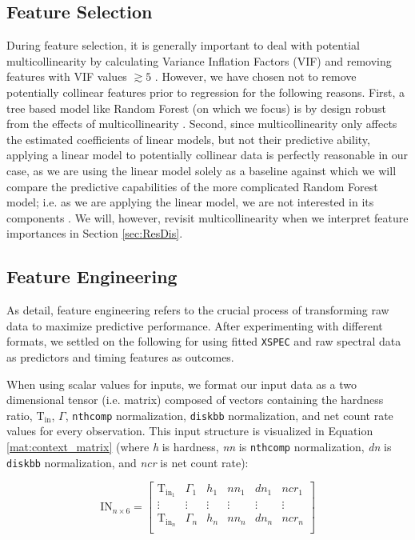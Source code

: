 \documentclass[fleqn,usenatbib]{mnras}
\begin{document}
\subsection{Feature Selection}

During feature selection, it is generally important to deal with potential multicollinearity by calculating Variance Inflation Factors (VIF) and removing features with VIF values $\gtrsim5$ \citep{kline1998principles, Sheather2008-mc}. However, we have chosen not to remove potentially collinear features prior to regression for the following reasons. First, a tree based model like Random Forest (on which we focus) is by design robust from the effects of multicollinearity \citep{Strobl2008,2021arXiv211102513C}. Second, since multicollinearity only affects the estimated coefficients of linear models, but not their predictive ability, applying a linear model to potentially collinear data is perfectly reasonable in our case, as we are using the linear model solely as a baseline against which we will compare the predictive capabilities of the more complicated Random Forest model; i.e. as we are applying the linear model, we are not interested in its components \citep{multicollinearity_class,multicollinearity_regression}. We will, however, revisit multicollinearity when we interpret feature importances in Section \ref{sec:ResDis}. 

\subsection{Feature Engineering}

As \cite{casari2018feature} detail, feature engineering refers to the crucial process of transforming raw data to maximize predictive performance. After experimenting with different formats, we settled on the following for using fitted \texttt{XSPEC} and raw spectral data as predictors and timing features as outcomes. 

When using scalar values for inputs, we format our input data as a two dimensional tensor (i.e. matrix) composed of vectors containing the hardness ratio, $\mathrm{T}_{\mathrm{in}}$, $\Gamma$, \texttt{nthcomp} normalization, \texttt{diskbb} normalization, and net count rate values for every observation. This input structure is visualized in Equation \ref{mat:context_matrix} (where \textit{h} is hardness, \textit{nn} is \texttt{nthcomp} normalization, \textit{dn} is \texttt{diskbb} normalization, and \textit{ncr} is net count rate): 

\begin{equation}\label{mat:context_matrix}
    \mathrm{IN}_{n\times6} =
    \begin{bmatrix}
    \mathrm{T}_{\mathrm{in}_1} & \Gamma_{1} & h_1 & nn_1 & dn_1 & ncr_1 \\
    \vdots & \vdots & \vdots & \vdots & \vdots & \vdots\\
    \mathrm{T}_{\mathrm{in}_n} & \Gamma_{n} & h_n & nn_n & dn_n & ncr_n \\
    \end{bmatrix}
\end{equation}
\end{document}
